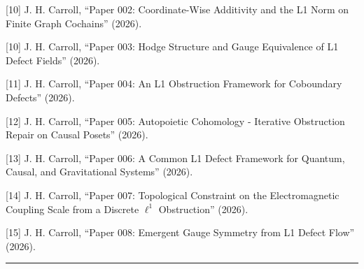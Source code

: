 \documentclass[
]{article}
\begin{document}
{[}10{]} J. H. Carroll, ``Paper 002: Coordinate-Wise Additivity and the
L1 Norm on Finite Graph Cochains'' (2026).

{[}10{]} J. H. Carroll, ``Paper 003: Hodge Structure and Gauge
Equivalence of L1 Defect Fields'' (2026).

{[}11{]} J. H. Carroll, ``Paper 004: An L1 Obstruction Framework for
Coboundary Defects'' (2026).

{[}12{]} J. H. Carroll, ``Paper 005: Autopoietic Cohomology - Iterative
Obstruction Repair on Causal Posets'' (2026).

{[}13{]} J. H. Carroll, ``Paper 006: A Common L1 Defect Framework for
Quantum, Causal, and Gravitational Systems'' (2026).

{[}14{]} J. H. Carroll, ``Paper 007: Topological Constraint on the
Electromagnetic Coupling Scale from a Discrete \(\ell^1\) Obstruction''
(2026).

{[}15{]} J. H. Carroll, ``Paper 008: Emergent Gauge Symmetry from L1
Defect Flow'' (2026).

\begin{center}\rule{0.5\linewidth}{0.5pt}\end{center}
\end{document}
